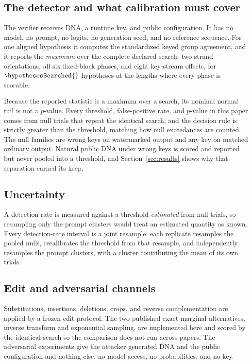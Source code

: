 \subsection{The detector and what calibration must cover}

The verifier receives DNA, a runtime key, and public configuration. It has no model, no prompt, no
logits, no generation seed, and no reference sequence. For one aligned hypothesis it computes the
standardized keyed group agreement, and it reports the \emph{maximum} over the complete declared
search: two strand orientations, all six fixed-block phases, and eight key-stream offsets, for
$\hypothesesSearched{}$ hypotheses at the lengths where every phase is scorable.

Because the reported statistic is a maximum over a search, its nominal normal tail is not a
$p$-value. Every threshold, false-positive rate, and $p$-value in this paper comes from null trials
that repeat the identical search, and the decision rule is strictly greater than the threshold,
matching how null exceedances are counted. The null families are wrong keys on watermarked output and
any key on matched ordinary output. Natural public DNA under wrong keys is scored and reported but
never pooled into a threshold, and Section~\ref{sec:results} shows why that separation earned its
keep.

\subsection{Uncertainty}

A detection rate is measured against a threshold \emph{estimated} from null trials, so resampling only
the prompt clusters would treat an estimated quantity as known. Every detection-rate interval is a
joint resample: each replicate resamples the pooled nulls, recalibrates the threshold from that
resample, and independently resamples the prompt clusters, with a cluster contributing the mean of its
own trials.

\subsection{Edit and adversarial channels}

Substitutions, insertions, deletions, crops, and reverse complementation are applied by a frozen edit
protocol. The two published exact-marginal alternatives, inverse transform and exponential sampling,
are implemented here and scored by the identical search so the comparison does not run across papers.
The adversarial experiments give the attacker generated DNA and the public configuration and nothing
else: no model access, no probabilities, and no key.
